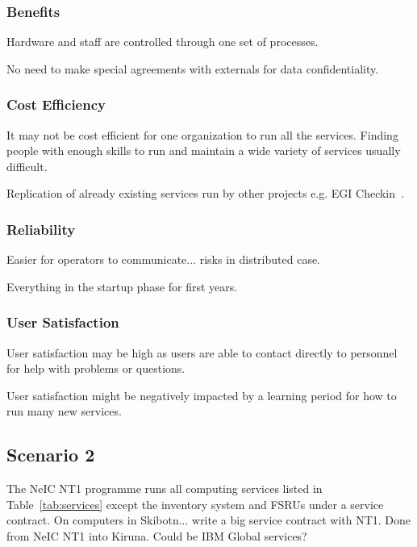 \documentclass[12pt,a4paper]{article}
\newcommand{\nnt}{NeIC NT1\xspace}
\begin{document}
\subsubsection*{Benefits}
\bitm
\item Hardware and staff are controlled through one set of \EC processes.
\item No need to make special agreements with externals for data confidentiality.
\eitm

\subsubsection*{Cost Efficiency}
\bitm
\item It may not be cost efficient for one organization to run all the services. Finding people with enough skills to run and maintain a wide variety of services usually difficult.
\item Replication of already existing services run by other \einfra projects e.g. EGI Checkin~\cite{egi-checkin}.
\eitm

\subsubsection*{Reliability}
\bitm
\item Easier for operators to communicate... risks in distributed case.
\item Everything in the startup phase for first years.
\eitm

\subsubsection*{User Satisfaction}
\bitm
\item User satisfaction may be high as users are able to contact directly to \EC personnel for help with problems or questions.
\item User satisfaction might be negatively impacted by a learning period for how to run many new services.
\eitm


\subsection{Scenario 2}
\label{ssec:scen2}

The \nnt programme runs all computing services listed in Table~\ref{tab:services} except the \ED inventory system and FSRUs under a service contract.
On computers in Skibotn... write a big service contract with NT1. 
Done from NeIC NT1 into Kiruna.
Could be IBM Global services?
\end{document}
